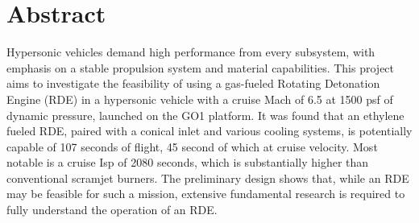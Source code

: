 \section{Abstract}
Hypersonic vehicles demand high performance from every subsystem, with emphasis on a stable propulsion system and material capabilities. This project aims to investigate the feasibility of using a gas-fueled Rotating Detonation Engine (RDE) in a hypersonic vehicle with a cruise Mach of 6.5 at 1500 psf of dynamic pressure, launched on the GO1 platform. It was found that an ethylene fueled RDE, paired with a conical inlet and various cooling systems, is potentially capable of 107 seconds of flight, 45 second of which at cruise velocity. Most notable is a cruise Isp of 2080 seconds, which is substantially higher than conventional scramjet burners. The preliminary design shows that, while an RDE may be feasible for such a mission, extensive fundamental research is required to fully understand the operation of an RDE.
